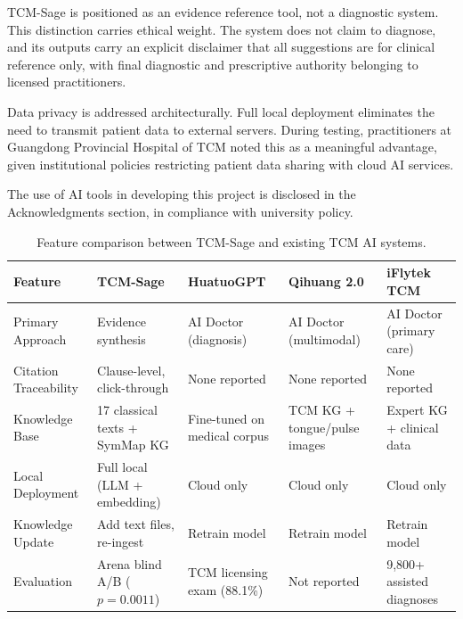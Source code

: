 TCM-Sage is positioned as an evidence reference tool, not a diagnostic system. This distinction carries ethical weight. The system does not claim to diagnose, and its outputs carry an explicit disclaimer that all suggestions are for clinical reference only, with final diagnostic and prescriptive authority belonging to licensed practitioners.

Data privacy is addressed architecturally. Full local deployment eliminates the need to transmit patient data to external servers. During testing, practitioners at Guangdong Provincial Hospital of TCM noted this as a meaningful advantage, given institutional policies restricting patient data sharing with cloud AI services.

The use of AI tools in developing this project is disclosed in the Acknowledgments section, in compliance with university policy.

\begin{table}[H]
\centering
\caption{Feature comparison between TCM-Sage and existing TCM AI systems.}
\label{tab:comparison}
\begin{tabularx}{\textwidth}{lXXXX}
\toprule
\textbf{Feature} & \textbf{TCM-Sage} & \textbf{HuatuoGPT} & \textbf{Qihuang 2.0} & \textbf{iFlytek TCM} \\
\midrule
Primary Approach & Evidence synthesis & AI Doctor (diagnosis) & AI Doctor (multimodal) & AI Doctor (primary care) \\
Citation Traceability & Clause-level, click-through & None reported & None reported & None reported \\
Knowledge Base & 17 classical texts + SymMap KG & Fine-tuned on medical corpus & TCM KG + tongue/pulse images & Expert KG + clinical data \\
Local Deployment & Full local (LLM + embedding) & Cloud only & Cloud only & Cloud only \\
Knowledge Update & Add text files, re-ingest & Retrain model & Retrain model & Retrain model \\
Evaluation & Arena blind A/B ($p=0.0011$) & TCM licensing exam (88.1\%) & Not reported & 9,800+ assisted diagnoses \\
\bottomrule
\end{tabularx}
\end{table}
